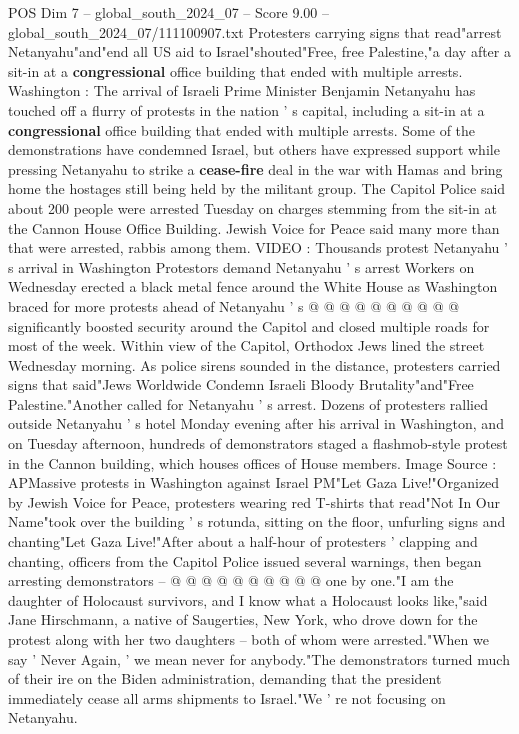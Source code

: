 \begin{textsample}{POS Dim 7 – global\_south\_2024\_07 – Score 9.00 – global\_south\_2024\_07/111100907.txt}  \label{ex:f7_pos_107}
Protesters carrying signs that read"arrest Netanyahu"and"end all US aid to Israel"shouted"Free, free Palestine,"a day after a sit-in at a \textbf{congressional} office building that ended with multiple arrests.
Washington : The arrival of Israeli Prime Minister Benjamin Netanyahu has touched off a flurry of protests in the nation ' s capital, including a sit-in at a \textbf{congressional} office building that ended with multiple arrests.
Some of the demonstrations have condemned Israel, but others have expressed support while pressing Netanyahu to strike a \textbf{cease-fire} deal in the war with Hamas and bring home the hostages still being held by the militant group.
The Capitol Police said about 200 people were arrested Tuesday on charges stemming from the sit-in at the Cannon House Office Building.
Jewish Voice for Peace said many more than that were arrested, rabbis among them.
VIDEO : Thousands protest Netanyahu ' s arrival in Washington Protestors demand Netanyahu ' s arrest Workers on Wednesday erected a black metal fence around the White House as Washington braced for more protests ahead of Netanyahu ' s @ @ @ @ @ @ @ @ @ @ significantly boosted security around the Capitol and closed multiple roads for most of the week.
Within view of the Capitol, Orthodox Jews lined the street Wednesday morning.
As police sirens sounded in the distance, protesters carried signs that said"Jews Worldwide Condemn Israeli Bloody Brutality"and"Free Palestine."Another called for Netanyahu ' s arrest.
Dozens of protesters rallied outside Netanyahu ' s hotel Monday evening after his arrival in Washington, and on Tuesday afternoon, hundreds of demonstrators staged a flashmob-style protest in the Cannon building, which houses offices of House members.
Image Source : APMassive protests in Washington against Israel PM"Let Gaza Live!"Organized by Jewish Voice for Peace, protesters wearing red T-shirts that read"Not In Our Name"took over the building ' s rotunda, sitting on the floor, unfurling signs and chanting"Let Gaza Live!"After about a half-hour of protesters ' clapping and chanting, officers from the Capitol Police issued several warnings, then began arresting demonstrators -- @ @ @ @ @ @ @ @ @ @ one by one."I am the daughter of Holocaust survivors, and I know what a Holocaust looks like,"said Jane Hirschmann, a native of Saugerties, New York, who drove down for the protest along with her two daughters -- both of whom were arrested."When we say ' Never Again, ' we mean never for anybody."The demonstrators turned much of their ire on the Biden administration, demanding that the president immediately cease all arms shipments to Israel."We ' re not focusing on Netanyahu.

\end{textsample}
